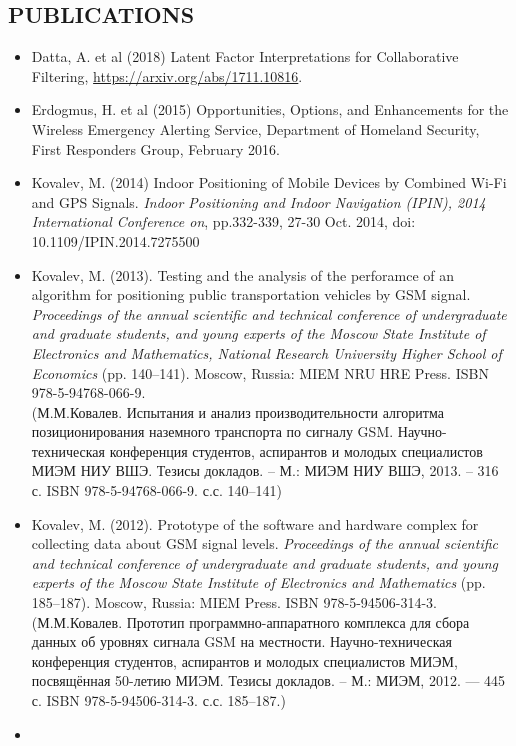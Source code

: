\documentclass{res}
\begin{document}
\begin{resume}
\section{PUBLICATIONS}
\begin{itemize}
	\item
		Datta, A. et al (2018)  Latent Factor Interpretations for Collaborative Filtering, \url{https://arxiv.org/abs/1711.10816}.
	\item
		Erdogmus, H. et al (2015) Opportunities, Options, and Enhancements for the Wireless Emergency Alerting Service, Department of Homeland Security, First Responders Group, February 2016.  
	\item
		Kovalev, M. (2014) Indoor Positioning of Mobile Devices by Combined Wi-Fi and GPS Signals. \emph{Indoor Positioning and Indoor Navigation (IPIN), 2014 International Conference on}, pp.332-339, 27-30 Oct. 2014, doi: 10.1109/IPIN.2014.7275500
	\item
		Kovalev, M. (2013). Testing and the analysis of the perforamce of an algorithm for positioning public transportation vehicles by GSM signal. \emph{Proceedings of the annual scientific and technical conference of undergraduate and graduate students, and young experts of the Moscow State Institute of Electronics and Mathematics, National Research University Higher School of Economics} (pp. 140--141). Moscow, Russia: MIEM NRU HRE Press. ISBN 978-5-94768-066-9.\\
		(М.М.Ковалев. Испытания и анализ производительности алгоритма позиционирования наземного транспорта по сигналу GSM. Научно-техническая конференция студентов, аспирантов и молодых специалистов МИЭМ НИУ ВШЭ. Тезисы докладов. -- М.: МИЭМ НИУ ВШЭ, 2013. -- 316 с. ISBN 978-5-94768-066-9. с.с. 140--141)
	\item
		Kovalev, M. (2012). Prototype of the software and hardware complex for collecting data about GSM signal levels. \emph{Proceedings of the annual scientific and technical conference of undergraduate and graduate students, and young experts of the Moscow State Institute of Electronics and Mathematics} (pp. 185--187). Moscow, Russia: MIEM Press. ISBN 978-5-94506-314-3.\\
		(М.М.Ковалев. Прототип программно-аппаратного комплекса для сбора данных об уровнях сигнала GSM на местности. Научно-техническая конференция студентов, аспирантов и молодых специалистов МИЭМ, посвящённая 50-летию МИЭМ. Тезисы докладов. -- М.: МИЭМ, 2012. --- 445 с. ISBN 978-5-94506-314-3. с.с. 185--187.)
	\item

\end{itemize}
\end{resume}
\end{document}
